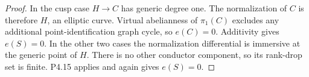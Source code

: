 \begin{proof}
In the cusp case $H\to C$ has generic degree one.
The normalization of $C$ is therefore $H$, an elliptic
curve. Virtual abelianness of $\pi_1(C)$ excludes any
additional point-identification graph cycle, so
$e(C)=0$. Additivity gives $e(S)=0$. In the other two
cases the normalization differential is immersive at
the generic point of $H$. There is no other conductor
component, so its rank-drop set is finite. P4.15
applies and again gives $e(S)=0$.
\end{proof}
